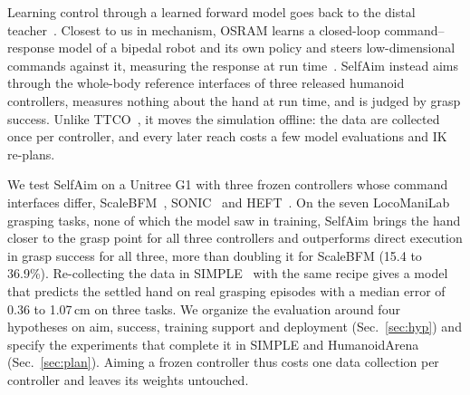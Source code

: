 \documentclass[conference]{IEEEtran}
\begin{document}
Learning control through a learned forward model goes back to the distal teacher~\cite{jordan1992}. Closest to us in mechanism, OSRAM learns a closed-loop command--response model of a bipedal robot and its own policy and steers low-dimensional commands against it, measuring the response at run time~\cite{osram}. SelfAim instead aims through the whole-body reference interfaces of three released humanoid controllers, measures nothing about the hand at run time, and is judged by grasp success. Unlike TTCO~\cite{ttco}, it moves the simulation offline: the data are collected once per controller, and every later reach costs a few model evaluations and IK re-plans.

We test SelfAim on a Unitree G1 with three frozen controllers whose command interfaces differ, ScaleBFM~\cite{scalebfm}, SONIC~\cite{sonic} and HEFT~\cite{heft}. On the seven LocoManiLab grasping tasks, none of which the model saw in training, SelfAim brings the hand closer to the grasp point for all three controllers and outperforms direct execution in grasp success for all three, more than doubling it for ScaleBFM (15.4 to 36.9\%). Re-collecting the data in SIMPLE~\cite{simple} with the same recipe gives a model that predicts the settled hand on real grasping episodes with a median error of 0.36 to 1.07\,cm on three tasks. We organize the evaluation around four hypotheses on aim, success, training support and deployment (Sec.~\ref{sec:hyp}) and specify the experiments that complete it in SIMPLE and HumanoidArena~\cite{humanoidarena} (Sec.~\ref{sec:plan}). Aiming a frozen controller thus costs one data collection per controller and leaves its weights untouched.
\end{document}
